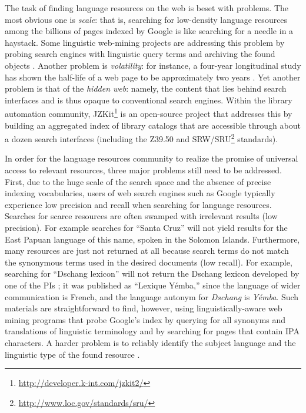 
The task of finding language resources on the web is beset with
problems.  The most obvious one is \emph{scale}: that is, searching for
low-density language resources among the billions of pages indexed
by Google is like searching for a needle in a haystack.  Some
linguistic web-mining projects are
addressing this problem by probing search engines with linguistic
query terms and archiving the found objects
\citep{Langendoen02,Lewis03,BaldwinBird06}.  Another problem is \emph{volatility}:
for instance, a four-year longitudinal study has shown the half-life
of a web page to be approximately two years \citep{Koehler02}.
Yet another problem is that of the
\emph{hidden web}: namely, the content that lies behind search
interfaces and is thus opaque to conventional search engines.
Within the library automation community, JZKit\footnote{\scriptsize\url{http://developer.k-int.com/jzkit2/}} is an open-source project
that addresses this by building an aggregated index of library
catalogs that are accessible through about a dozen search interfaces
(including the Z39.50 and SRW/SRU\footnote{\scriptsize\url{http://www.loc.gov/standards/sru/}} standards).


In order for the language resources community to realize the promise of universal access to relevant resources, three major
problems still need to be addressed.
First, due to the huge scale of the search space and the absence
of precise indexing vocabularies,
users of web search engines such as Google typically experience
low precision and recall when searching for language resources.
Searches for scarce resources are often swamped with irrelevant
results (low precision).  For example searches for ``Santa Cruz'' will
not yield results for the East Papuan language of this name, spoken in
the Solomon Islands.
Furthermore, many resources are just not returned at all because
search terms do not match the synonymous terms used in the desired
documents (low recall).  For example, searching for ``Dschang lexicon''
will not return the Dschang lexicon developed by one of the PIs
\citep{BirdTadadjeu97}; it was published as ``Lexique Y\'emba,'' since
the language of wider communication is French, and the language
autonym for \textit{Dschang} is \textit{Y\'emba}.
Such materials are straightforward to find, however, using
linguistically-aware web mining programs that probe
Google's index by querying for all synonyms and translations of
linguistic terminology and by searching for pages that contain IPA characters.
A harder problem is to reliably identify the subject language and the
linguistic type of the found resource \citep{HughesBaldwin06lrec}.


